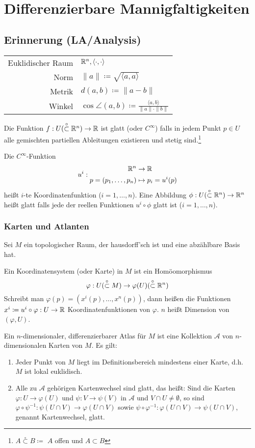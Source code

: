 \documentclass[a4paper,twoside,DIV15,BCOR12mm]{scrbook}
\newcommand{\otm}{\stackrel{\circ}{\subset}} %
\newcommand{\At}{\mathcal A}
\renewcommand{\da}{\coloneqq}
\begin{document}
\section{Differenzierbare Mannigfaltigkeiten}

\subsection*{Erinnerung (LA/Analysis)}
\begin{tabular}{rl}
Euklidischer Raum & $\mathbb{R}^n, \langle\cdot,\cdot\rangle$ \\
Norm & $ \|a\| \da  \sqrt{\langle a, a\rangle} $ \\
Metrik & $d(a,b) \da  \| a-b\| $ \\
Winkel & $\cos \angle(a,b) \da  \frac{\langle a, b\rangle}{\|a\|\cdot\|b\|} $ 
\end{tabular}

Die Funktion $f:U (\otm \MdR^n) \to \MdR$ ist glatt (oder $C^\infty$) falls in jedem Punkt $p\in U$ alle gemischten partiellen Ableitungen existieren und stetig sind.\footnote{$A\otm B \da  $ $A$ offen und $A\subset B$}

Die $C^\infty$-Funktion
\[ u^i:
\begin{aligned}
\mathbb{R}^n &\to \mathbb{R} \\
p = (p_1,\ldots,p_n) &\mapsto p_i =u^i(p)
\end{aligned}
\]
heißt $i$-te Koordinatenfunktion ($i=1,\ldots,n$). Eine Abbildung $\phi: U(\otm \MdR^n)\to \MdR^n$ heißt glatt falls jede der reellen Funktionen $u^i\circ\phi$ glatt ist ($i=1,\ldots,n$).

\subsubsection*{Karten und Atlanten}
Sei $M$ ein topologischer Raum, der hausdorff’sch ist und eine abzählbare Basis hat.

Ein Koordinatensystem (oder Karte) in $M$ ist ein Homöomorphismus
\[\varphi: U(\otm M) \to \varphi(U) (\otm\MdR^n) \]
Schreibt man $\varphi(p) = (x^i(p),\ldots,x^n(p))$, dann heißen die Funktionen $x^i \da  u^i\circ \varphi : U \to \MdR$ Koordinatenfunktionen von $\varphi$. $n$ heißt Dimension von $(\varphi,U)$.

Ein $n$-dimensionaler, differenzierbarer Atlas für $M$ ist eine Kollektion $\At$ von $n$-dimensionalen Karten von $M$. Es gilt:
\begin{enumerate}[($\At$1)]
\item Jeder Punkt von $M$ liegt im Definitionsbereich mindestens einer Karte, d.h. $M$ ist lokal euklidisch.
\item Alle zu $\At$ gehörigen Kartenwechsel sind glatt, das heißt: Sind die Karten $\varphi: U\to \varphi(U)$ und $\psi:V\to\psi(V)$ in $\At$ und $V\cap U \ne \emptyset$, so sind $\varphi \circ \psi^{-1}: \psi(U\cap V) \to \varphi(U\cap V)$ sowie $\psi \circ \varphi^{-1}: \varphi(U\cap V) \to \psi(U \cap V)$, genannt Kartenwechsel, glatt.
\end{enumerate}
\end{document}
